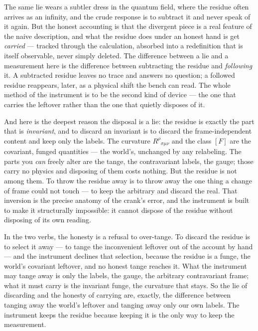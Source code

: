 The same lie wears a subtler dress in the quantum field, where the residue often arrives as an infinity, and the crude
response is to subtract it and never speak of it again. But the honest accounting is that the divergent piece is a real
feature of the naive description, and what the residue does under an honest hand is get \emph{carried} --- tracked through
the calculation, absorbed into a redefinition that is itself observable, never simply deleted. The difference between a lie
and a measurement here is the difference between subtracting the residue and \emph{following} it. A subtracted residue
leaves no trace and answers no question; a followed residue reappears, later, as a physical shift the bench can read. The
whole method of the instrument is to be the second kind of device --- the one that carries the leftover rather than the one
that quietly disposes of it.

And here is the deepest reason the disposal is a lie: the residue is exactly the part that is \emph{invariant}, and to
discard an invariant is to discard the frame-independent content and keep only the labels. The curvature $R^\rho{}_{\sigma
\mu\nu}$ and the class $[F]$ are the covariant, funged quantities --- the world's, unchanged by any relabeling. The parts you
\emph{can} freely alter are the tange, the contravariant labels, the gauge; those carry no physics and disposing of them
costs nothing. But the residue is not among them. To throw the residue away is to throw away the one thing a change of frame
could not touch --- to keep the arbitrary and discard the real. That inversion is the precise anatomy of the crank's error,
and the instrument is built to make it structurally impossible: it cannot dispose of the residue without disposing of its
own reading.

In the two verbs, the honesty is a refusal to over-tange. To discard the residue is to select it away --- to tange the
inconvenient leftover out of the account by hand --- and the instrument declines that selection, because the residue is a
funge, the world's covariant leftover, and no honest tange reaches it. What the instrument may tange away is only the labels,
the gauge, the arbitrary contravariant frame; what it must carry is the invariant funge, the curvature that stays. So the
lie of discarding and the honesty of carrying are, exactly, the difference between tanging away the world's leftover and
tanging away only our own labels. The instrument keeps the residue because keeping it is the only way to keep the
measurement.

